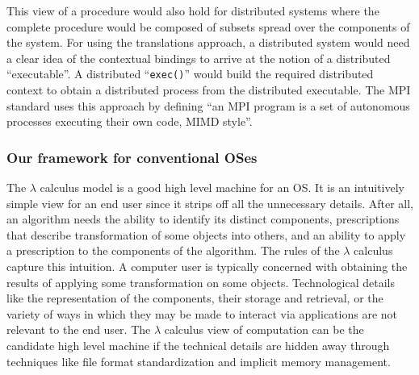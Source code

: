 \documentclass[draft]{article}
\begin{document}
This view of a procedure would also hold for distributed systems where
the complete  procedure would be  composed of subsets spread  over the
components  of the  system.  For  using the  translations  approach, a
distributed system would need a  clear idea of the contextual bindings
to  arrive   at  the  notion  of  a   distributed  ``executable''.   A
distributed ``\texttt{exec()}''  would build the  required distributed
context  to   obtain  a  distributed  process   from  the  distributed
executable.  The MPI  standard uses this approach \cite{mpi:processes}
by  defining  ``an  MPI  program  is a  set  of  autonomous  processes
executing their own code, MIMD style''.

\subsubsection{Our framework for conventional OSes}
\label{sec:our:framework:for:os}

The $\lambda$ calculus  model is a good high level  machine for an OS.
It is an  intuitively simple view for an end user  since it strips off
all  the  unnecessary details.   After  all,  an  algorithm needs  the
ability  to  identify  its  distinct  components,  prescriptions  that
describe transformation of some objects into others, and an ability to
apply a prescription to the components of the algorithm.  The rules of
the  $\lambda$ calculus capture  this intuition.   A computer  user is
typically  concerned  with  obtaining  the results  of  applying  some
transformation  on  some  objects.   Technological  details  like  the
representation of the components,  their storage and retrieval, or the
variety of ways in which they may be made to interact via applications
are  not relevant to  the end  user.  The  $\lambda$ calculus  view of
computation can be  the candidate high level machine  if the technical
details  are   hidden  away   through  techniques  like   file  format
standardization  and implicit  memory  management.
\end{document}
